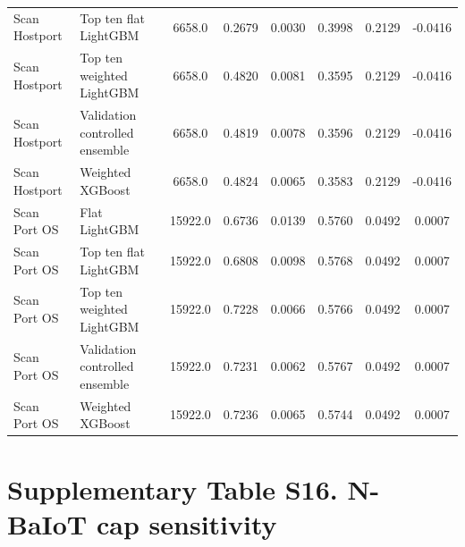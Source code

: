 \documentclass[10pt]{article}
\begin{document}
\begin{center}
\begin{longtable}{p{2.4cm}p{2.6cm}cccccc}
Scan Hostport & Top ten flat LightGBM & 6658.0 & 0.2679 & 0.0030 & 0.3998 & 0.2129 & -0.0416 \\
Scan Hostport & Top ten weighted LightGBM & 6658.0 & 0.4820 & 0.0081 & 0.3595 & 0.2129 & -0.0416 \\
Scan Hostport & Validation controlled ensemble & 6658.0 & 0.4819 & 0.0078 & 0.3596 & 0.2129 & -0.0416 \\
Scan Hostport & Weighted XGBoost & 6658.0 & 0.4824 & 0.0065 & 0.3583 & 0.2129 & -0.0416 \\
Scan Port OS & Flat LightGBM & 15922.0 & 0.6736 & 0.0139 & 0.5760 & 0.0492 & 0.0007 \\
Scan Port OS & Top ten flat LightGBM & 15922.0 & 0.6808 & 0.0098 & 0.5768 & 0.0492 & 0.0007 \\
Scan Port OS & Top ten weighted LightGBM & 15922.0 & 0.7228 & 0.0066 & 0.5766 & 0.0492 & 0.0007 \\
Scan Port OS & Validation controlled ensemble & 15922.0 & 0.7231 & 0.0062 & 0.5767 & 0.0492 & 0.0007 \\
Scan Port OS & Weighted XGBoost & 15922.0 & 0.7236 & 0.0065 & 0.5744 & 0.0492 & 0.0007 \\
\bottomrule
\end{longtable}
\end{center}

\section*{Supplementary Table S16. N-BaIoT cap sensitivity}
\end{document}
